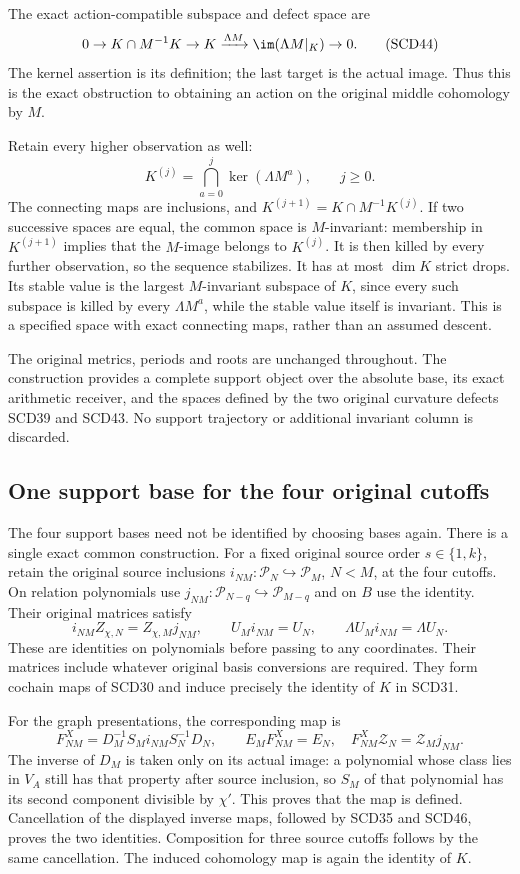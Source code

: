 \documentclass[11pt,a4paper]{article}
\theoremstyle{definition}\newtheorem{definition}[theorem]{Definition}
\newcommand{\Pp}{\mathcal P}\newcommand{\LL}{\mathcal L}
\begin{document}
The exact action-compatible subspace and defect space are
\[
 0\to K\cap M^{-1}K\to K
 \xrightarrow{\Lambda M}\im(\Lambda M|_K)\to0.
 \tag{SCD44}
\]
The kernel assertion is its definition; the last target is the
actual image. Thus this is the exact obstruction to obtaining
an action on the original middle cohomology by \(M\).

Retain every higher observation as well:
\[
 K^{(j)}=\bigcap_{a=0}^{j}\ker(\Lambda M^a),\qquad j\ge0.
 \tag{SCD45}
\]
The connecting maps are inclusions, and
\(K^{(j+1)}=K\cap M^{-1}K^{(j)}\). If two successive spaces
are equal, the common space is \(M\)-invariant: membership in
\(K^{(j+1)}\) implies that the \(M\)-image belongs to \(K^{(j)}\).
It is then killed by every further observation, so the sequence
stabilizes. It has at most \(\dim K\) strict drops. Its stable
value is the largest \(M\)-invariant subspace of \(K\), since
every such subspace is killed by every \(\Lambda M^a\), while
the stable value itself is invariant. This is a specified space
with exact connecting maps, rather than an assumed descent.

The original metrics, periods and roots are unchanged throughout.
The construction provides a complete support object over the
absolute base, its exact arithmetic receiver, and the spaces
defined by the two original curvature defects SCD39 and SCD43.
No support trajectory or additional invariant column is discarded.

\subsection{One support base for the four original cutoffs}

The four support bases need not be identified by choosing bases again.
There is a single exact common construction. For a fixed original source
order \(s\in\{1,k\}\), retain the original source inclusions
\(i_{NM}:\Pp_N\hookrightarrow\Pp_M\), \(N<M\), at the four cutoffs.
On relation polynomials use \(j_{NM}:\Pp_{N-q}\hookrightarrow\Pp_{M-q}\)
and on \(B\) use the identity. Their original matrices satisfy
\[
 i_{NM}Z_{\chi,N}=Z_{\chi,M}j_{NM},\qquad
 U_Mi_{NM}=U_N,\qquad
 \Lambda U_Mi_{NM}=\Lambda U_N .
 \tag{SCD46}
\]
These are identities on polynomials before passing to any coordinates.
Their matrices include whatever original basis conversions are required.
They form cochain maps of SCD30 and induce precisely the identity of
\(K\) in SCD31.

For the graph presentations, the corresponding map is
\[
 F^X_{NM}=D_M^{-1}S_Mi_{NM}S_N^{-1}D_N,\qquad
 E_MF^X_{NM}=E_N,\quad
 F^X_{NM}\mathcal Z_N=\mathcal Z_Mj_{NM}.
 \tag{SCD47}
\]
The inverse of \(D_M\) is taken only on its actual image: a polynomial
whose class lies in \(V_A\) still has that property after source inclusion,
so \(S_M\) of that polynomial has its second component divisible by
\(\chi'\). This proves that the map is defined. Cancellation of the
displayed inverse maps, followed by SCD35 and SCD46, proves the two
identities. Composition for three source cutoffs follows by the same
cancellation. The induced cohomology map is again the identity of \(K\).
\end{document}
